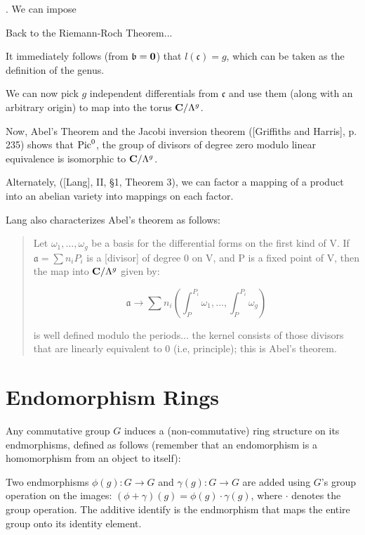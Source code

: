 .  We can impose

\endtheorem

Back to the Riemann-Roch Theorem...

It immediately follows (from $\mathfrak{b}={\bf 0}$) that
$l(\mathfrak{c})=g$, which can be taken as the definition of the
genus.

We can now pick $g$ independent differentials from $\mathfrak{c}$ and
use them (along with an arbitrary origin) to map into the torus
${\bf C}/\Lambda^g$.

Now, Abel's Theorem and the Jacobi inversion theorem ([Griffiths and
Harris], p. 235) shows that ${\rm Pic}^0$, the group of divisors of
degree zero modulo linear equivalence is isomorphic to ${\bf
C}/\Lambda^g$.

Alternately, ([Lang], II, \S1, Theorem 3), we can factor a mapping
of a product into an abelian variety into mappings on each factor.

Lang also characterizes Abel's theorem as follows:

\begin{quote}

Let $\omega_1, ..., \omega_g$ be a basis for the differential forms
on the first kind of V.  If $\mathfrak{a} = \sum n_i P_i$ is a
[divisor] of degree 0 on V, and P is a fixed point of V, then
the map into ${\bf C}/\Lambda^g$ given by:

$$\mathfrak{a} \to \sum n_i (\int_P^{P_i}\omega_1, ..., \int_P^{P_i}\omega_g)$$

is well defined modulo the periods... the kernel consists of those
divisors that are linearly equivalent to 0 (i.e, principle); this is
Abel's theorem.

\end{quote}


\section{Endomorphism Rings}

Any commutative group $G$ induces a (non-commutative) ring structure
on its endmorphisms, defined as follows (remember that an
endomorphism is a homomorphism from an object to itself):

Two endmorphisms $\phi(g): G \to G$ and $\gamma(g): G \to G$ are added
using $G$'s group operation on the images: $(\phi+\gamma)(g) =
\phi(g)\cdot\gamma(g)$, where $\cdot$ denotes the group operation.
The additive identify is the endmorphism that maps the entire group
onto its identity element.

